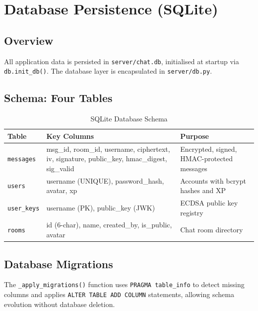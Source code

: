 \documentclass[12pt, a4paper]{article}
\begin{document}
\section{Database Persistence (SQLite)}

\subsection{Overview}

All application data is persisted in \texttt{server/chat.db}, initialised at startup via \texttt{db.init\_db()}. The database layer is encapsulated in \texttt{server/db.py}.

\subsection{Schema: Four Tables}

\begin{table}[H]
    \centering
    \small
    \caption{SQLite Database Schema}
    \begin{tabularx}{\textwidth}{l X X}
        \toprule
        \textbf{Table} & \textbf{Key Columns} & \textbf{Purpose} \\
        \midrule
        \texttt{messages}   & msg\_id, room\_id, username, ciphertext, iv, signature, public\_key, hmac\_digest, sig\_valid & Encrypted, signed, HMAC-protected messages \\
        \texttt{users}      & username (UNIQUE), password\_hash, avatar, xp & Accounts with bcrypt hashes and XP \\
        \texttt{user\_keys} & username (PK), public\_key (JWK) & ECDSA public key registry \\
        \texttt{rooms}      & id (6-char), name, created\_by, is\_public, avatar & Chat room directory \\
        \bottomrule
    \end{tabularx}
\end{table}



\subsection{Database Migrations}

The \texttt{\_apply\_migrations()} function uses \texttt{PRAGMA table\_info} to detect missing columns and applies \texttt{ALTER TABLE ADD COLUMN} statements, allowing schema evolution without database deletion.
\end{document}

